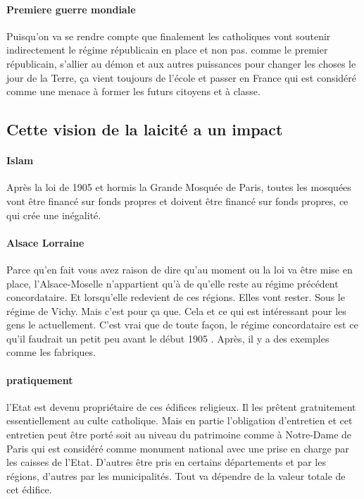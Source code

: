 \paragraph{Premiere guerre mondiale}
 
Puisqu'on va se rendre compte que finalement les catholiques vont soutenir indirectement le régime républicain en place et non pas. comme le premier républicain, s'allier au démon et aux autres puissances pour changer les choses le jour de la Terre, ça vient toujours de l'école et  passer en France qui est considéré comme une menace à  former les futurs citoyens et  à  classe.


\subsection{Cette vision de la laicité a un impact}

\paragraph{Islam}

 Après la loi de 1905 et hormis la Grande Mosquée de Paris, toutes les mosquées vont être financé sur fonds propres et doivent être financé sur fonds propres, ce qui crée une inégalité.

 \paragraph{Alsace Lorraine}
Parce qu'en fait vous avez raison de dire qu'au moment ou la loi va être mise en place, l'Alsace-Moselle n'appartient qu'à  de qu'elle reste au régime précédent concordataire. Et lorsqu'elle redevient de ces régions.
Elles vont rester.
Sous le régime de Vichy. Mais c'est pour ça que.
Cela et ce qui est intéressant pour les gens le actuellement. C'est vrai que de toute façon, le régime concordataire est ce qu'il faudrait un petit peu avant le début 1905 . Après, il y a des exemples comme les fabriques.

\paragraph{pratiquement}
 l'Etat est devenu propriétaire de ces édifices religieux.
Il les prêtent gratuitement essentiellement au culte catholique.
Mais en partie l'obligation d'entretien et cet entretien peut être porté soit au niveau du patrimoine comme à  Notre-Dame de Paris qui est considéré comme monument national avec une prise en charge par les caisses de l'Etat.
D'autres être pris en certains départements et par les régions, d'autres par les municipalités. Tout va dépendre de la valeur totale de cet édifice. 


